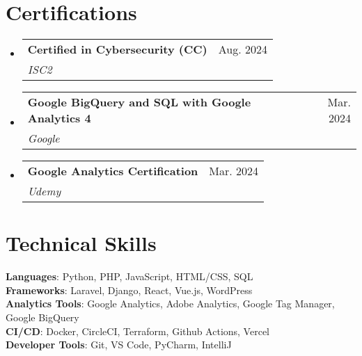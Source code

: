 \documentclass[letterpaper,11pt]{article}
\makeatletter
\newcommand{\resumeSubheading}[4]{
  \vspace{-2pt}\item
    \begin{tabular*}{0.97\textwidth}[t]{l@{\extracolsep{\fill}}r}
      \textbf{#1} & #2 \\
      \textit{\small#3} & \textit{\small #4} \\
    \end{tabular*}\vspace{-7pt}
}
\newcommand{\resumeSubHeadingListStart}{\begin{itemize}[leftmargin=0.15in, label={}]}
\newcommand{\resumeSubHeadingListEnd}{\end{itemize}}
\makeatother
\begin{document}
\section{Certifications}
  \resumeSubHeadingListStart
    \resumeSubheading
      {Certified in Cybersecurity (CC)}{Aug. 2024}
      {ISC2}{}
    \resumeSubheading
      {Google BigQuery and SQL with Google Analytics 4}{Mar. 2024}
      {Google}{}
    \resumeSubheading
      {Google Analytics Certification}{Mar. 2024}
      {Udemy}{}
  \resumeSubHeadingListEnd

\section{Technical Skills}
  \begin{itemize}[leftmargin=0.15in, label={}]
    \small{\item{
     \textbf{Languages}{: Python, PHP, JavaScript, HTML/CSS, SQL } \\
     \textbf{Frameworks}{: Laravel, Django, React, Vue.js, WordPress } \\
     \textbf{Analytics Tools}{: Google Analytics, Adobe Analytics, Google Tag Manager, Google BigQuery} \\
     \textbf{CI/CD}{: Docker, CircleCI, Terraform, Github Actions, Vercel } \\
     \textbf{Developer Tools}{: Git, VS Code,  PyCharm, IntelliJ} \\
    }}
 \end{itemize}


\end{document}
